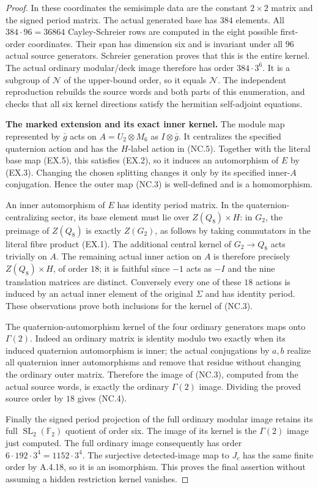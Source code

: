 \begin{proof}
In these coordinates the semisimple data are the
constant $2\times2$ matrix and the signed period
matrix.  The actual generated base has $384$
elements.  All $384\cdot96=36864$ Cayley-Schreier
rows are computed in the eight possible first-order
coordinates.  Their span has dimension six and is
invariant under all $96$ actual source generators.
Schreier generation proves that this is the entire
kernel.  The actual ordinary modular/deck image
therefore has order $384\cdot3^6$.
It is a subgroup of $\mathscr N$ of the upper-bound
order, so it equals $\mathscr N$.
The independent reproduction rebuilds the source
words and both parts of this enumeration, and
checks that all six kernel directions satisfy
the hermitian self-adjoint equations.

\textbf{The marked extension and its exact inner kernel.}
The module map represented by $\bar g$ acts on
$A=U_2\otimes M_6$ as $I\otimes\bar g$.
It centralizes the specified quaternion action
and has the $H$-label action in (NC.5).
Together with the literal base map (EX.5), this
satisfies (EX.2), so it induces an automorphism
of $E$ by (EX.3).  Changing the chosen splitting
changes it only by its specified inner-$A$
conjugation.  Hence the outer map (NC.3) is
well-defined and is a homomorphism.

An inner automorphism of $E$ has identity period
matrix.  In the quaternion-centralizing sector,
its base element must lie over $Z(Q_8)\times H$:
in $G_2$, the preimage of $Z(Q_8)$ is exactly
$Z(G_2)$, as follows by taking commutators in the
literal fibre product (EX.1).
The additional central kernel of $G_2\to Q_8$
acts trivially on $A$.  The remaining actual
inner action on $A$ is therefore precisely
$Z(Q_8)\times H$, of order $18$; it is faithful
since $-1$ acts as $-I$ and the nine translation
matrices are distinct.  Conversely every one
of these $18$ actions is induced by an actual
inner element of the original $\Sigma$ and
has identity period.  These observations prove
both inclusions for the kernel of (NC.3).

The quaternion-automorphism kernel of the four
ordinary generators maps onto $\Gamma(2)$.
Indeed an ordinary matrix is identity modulo two
exactly when its induced quaternion automorphism
is inner; the actual conjugations by $a,b$
realize all quaternion inner automorphisms and
remove that residue without changing the
ordinary outer matrix.  Therefore the image of
(NC.3), computed from the actual source words,
is exactly the ordinary $\Gamma(2)$ image.
Dividing the proved source order by $18$ gives
(NC.4).

Finally the signed period projection of the full
ordinary modular image retains its full
$\operatorname{SL}_2(\mathbb F_2)$ quotient of
order six.  The image of its kernel is the
$\Gamma(2)$ image just computed.  The full
ordinary image consequently has order
$6\cdot192\cdot3^4=1152\cdot3^4$.
The surjective detected-image map to $J_c$ has
the same finite order by A.4.18, so it is an
isomorphism.  This proves the final assertion
without assuming a hidden restriction kernel
vanishes.
\end{proof}

